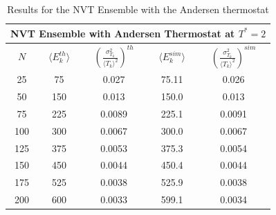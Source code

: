 \documentclass[../main.tex]{subfiles}
\begin{document}
\begin{table}[h!]
    \centering
    \begin{tabular}{ccccc}
        \toprule
        \multicolumn{5}{c}{\textbf{NVT Ensemble with Andersen Thermostat at $T^*=2$}}\\
        \midrule
        $N$     & $\langle E_k^{th}\rangle$ & $\left(\frac{\sigma^2_{T_k}}{\langle T_k\rangle^2}\right)^{th}$ & $\langle E_k^{sim}\rangle$ & $\left(\frac{\sigma^2_{T_k}}{\langle T_k\rangle^2}\right)^{sim}$\\
        \hline
        25  & 75  & 0.027  & 75.11 & 0.026 \\
        50  & 150 & 0.013  & 150.0 & 0.013 \\
        75  & 225 & 0.0089 & 225.1 & 0.0091 \\
        100 & 300 & 0.0067 & 300.0 & 0.0067 \\
        125 & 375 & 0.0053 & 375.3 & 0.0054 \\
        150 & 450 & 0.0044 & 450.4 & 0.0044 \\
        175 & 525 & 0.0038 & 525.9 & 0.0038 \\
        200 & 600 & 0.0033 & 599.1 & 0.0034 \\
        \hline
    \end{tabular}
    \caption{Results for the NVT Ensemble with the Andersen thermostat}
    \label{tab: ex_10_nvt_andersen}
\end{table}
\end{document}
